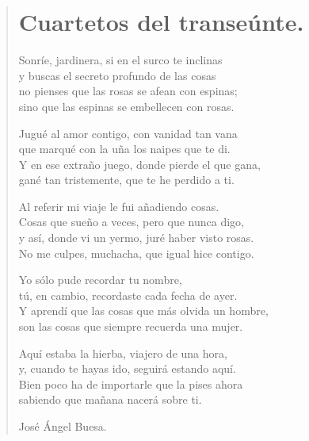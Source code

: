 \documentclass[11pt, portrait, twoside, notitlepage, openright]{book}
\begin{document}
\newpage
\begin{verse}
\begin{center}
\section{Cuartetos del transeúnte.}
\end{center}
Sonríe, jardinera, si en el surco te inclinas\\
y buscas el secreto profundo de las cosas\\
no pienses que las rosas se afean con espinas;\\
sino que las espinas se embellecen con rosas.
\newline

Jugué al amor contigo, con vanidad tan vana\\
que marqué con la uña los naipes que te di.\\
Y en ese extraño juego, donde pierde el que gana,\\
gané tan tristemente, que te he perdido a ti.
\newline

Al referir mi viaje le fui añadiendo cosas.\\
Cosas que sueño a veces, pero que nunca digo,\\
y así, donde vi un yermo, juré haber visto rosas.\\
No me culpes, muchacha, que igual hice contigo.
\newline

Yo sólo pude recordar tu nombre,\\
tú, en cambio, recordaste cada fecha de ayer.\\
Y aprendí que las cosas que más olvida un hombre,\\
son las cosas que siempre recuerda una mujer.
\newpage

Aquí estaba la hierba, viajero de una hora,\\
y, cuando te hayas ido, seguirá estando aquí.\\
Bien poco ha de importarle que la pises ahora\\
sabiendo que mañana nacerá sobre ti.
\newline

José Ángel Buesa.
\end{verse}
\end{document}
